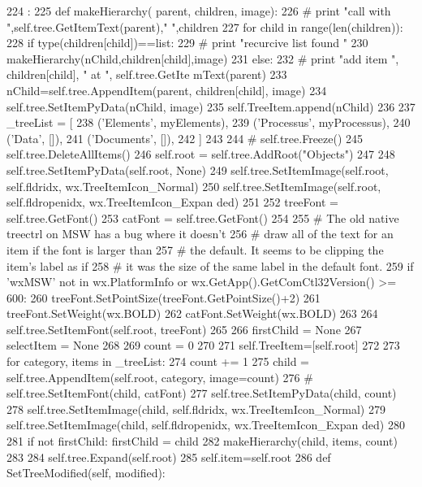 \begin{DoxyCode}
224                                                     :
225         def makeHierarchy( parent, children, image):
226 #            print "call with ",self.tree.GetItemText(parent)," ",children 
227             for child in range(len(children)):
228                 if type(children[child])==list:
229 #                    print "recurcive list found "
230                     makeHierarchy(nChild,children[child],image)
231                 else:
232 #                    print "add item ", children[child], " at ", self.tree.GetIte
      mText(parent)                    
233                     nChild=self.tree.AppendItem(parent, children[child], image)
234                     self.tree.SetItemPyData(nChild, image)
235                     self.TreeItem.append(nChild)            
236 
237         _treeList = [
238                      ('Elements',  myElements),
239                      ('Processus', myProcessus),
240                      ('Data',      []),
241                      ('Documents', []),
242                      ]
243 
244 #        self.tree.Freeze()
245         self.tree.DeleteAllItems()
246         self.root = self.tree.AddRoot("Objects")
247 
248         self.tree.SetItemPyData(self.root, None)
249         self.tree.SetItemImage(self.root, self.fldridx, wx.TreeItemIcon_Normal)
250         self.tree.SetItemImage(self.root, self.fldropenidx, wx.TreeItemIcon_Expan
      ded)
251 
252         treeFont = self.tree.GetFont()
253         catFont = self.tree.GetFont()
254 
255         # The old native treectrl on MSW has a bug where it doesn't
256         # draw all of the text for an item if the font is larger than
257         # the default.  It seems to be clipping the item's label as if
258         # it was the size of the same label in the default font.
259         if 'wxMSW' not in wx.PlatformInfo or wx.GetApp().GetComCtl32Version() >= 
      600:
260             treeFont.SetPointSize(treeFont.GetPointSize()+2)
261             treeFont.SetWeight(wx.BOLD)
262             catFont.SetWeight(wx.BOLD)
263 
264         self.tree.SetItemFont(self.root, treeFont)
265 
266         firstChild = None
267         selectItem = None
268 
269         count = 0
270 
271         self.TreeItem=[self.root]
272 
273         for category, items in _treeList:
274             count += 1
275             child = self.tree.AppendItem(self.root, category, image=count)
276 #            self.tree.SetItemFont(child, catFont)
277             self.tree.SetItemPyData(child, count)
278             self.tree.SetItemImage(child, self.fldridx, wx.TreeItemIcon_Normal)
279             self.tree.SetItemImage(child, self.fldropenidx, wx.TreeItemIcon_Expan
      ded)
280             
281             if not firstChild: firstChild = child
282             makeHierarchy(child, items, count)
283 
284         self.tree.Expand(self.root)
285         self.item=self.root
286 
    def SetTreeModified(self, modified):
\end{DoxyCode}

